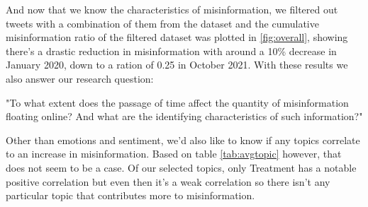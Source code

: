 \documentclass{l4proj}
\begin{document}
And now that we know the characteristics of misinformation, we filtered out tweets with a combination of them from the dataset and the cumulative misinformation ratio of the filtered dataset was plotted in \ref{fig:overall}, showing there's a drastic reduction in misinformation with around a 10\% decrease in January 2020, down to a ration of 0.25 in October 2021. With these results we also answer our research question:

\vspace{0.4cm}
\begin{center}
    "To what extent does the passage of time affect the quantity of misinformation floating online? And what are the identifying characteristics of such information?"
\end{center}
\vspace{0.4cm}

Other than emotions and sentiment, we'd also like to know if any topics correlate to an increase in misinformation. Based on table \ref{tab:avgtopic} however, that does not seem to be a case. Of our selected topics, only Treatment has a notable positive correlation but even then it's a weak correlation so there isn't any particular topic that contributes more to misinformation.


\begin{table}[H]
\centering
{}
\caption{Average Pearson Correlation Coefficients for Topics}
\label{tab:avgtopic}
\end{table}
\end{document}
